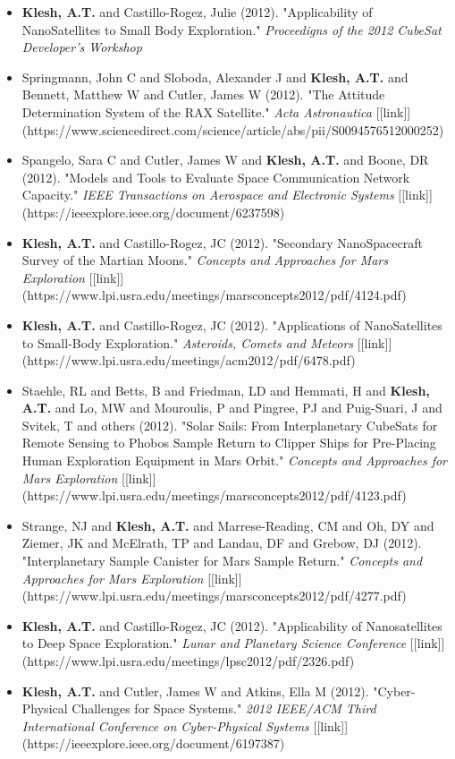 \documentclass[11pt,letterpaper]{article}
\begin{document}
\begin{itemize}
\item \textbf{Klesh, A.T.} and Castillo-Rogez, Julie (2012). "Applicability of NanoSatellites to Small Body Exploration." \textit{Proceedigns of the 2012 CubeSat Developer's Workshop}
\item Springmann, John C and Sloboda, Alexander J and \textbf{Klesh, A.T.} and Bennett, Matthew W and Cutler, James W (2012). "The Attitude Determination System of the RAX Satellite." \textit{Acta Astronautica} [[link]](https://www.sciencedirect.com/science/article/abs/pii/S0094576512000252)
\item Spangelo, Sara C and Cutler, James W and \textbf{Klesh, A.T.} and Boone, DR (2012). "Models and Tools to Evaluate Space Communication Network Capacity." \textit{IEEE Transactions on Aerospace and Electronic Systems} [[link]](https://ieeexplore.ieee.org/document/6237598)
\item \textbf{Klesh, A.T.} and Castillo-Rogez, JC (2012). "Secondary NanoSpacecraft Survey of the Martian Moons." \textit{Concepts and Approaches for Mars Exploration} [[link]](https://www.lpi.usra.edu/meetings/marsconcepts2012/pdf/4124.pdf)
\item \textbf{Klesh, A.T.} and Castillo-Rogez, JC (2012). "Applications of NanoSatellites to Small-Body Exploration." \textit{Asteroids, Comets and Meteors} [[link]](https://www.lpi.usra.edu/meetings/acm2012/pdf/6478.pdf)
\item Staehle, RL and Betts, B and Friedman, LD and Hemmati, H and \textbf{Klesh, A.T.} and Lo, MW and Mouroulis, P and Pingree, PJ and Puig-Suari, J and Svitek, T and others (2012). "Solar Sails: From Interplanetary CubeSats for Remote Sensing to Phobos Sample Return to Clipper Ships for Pre-Placing Human Exploration Equipment in Mars Orbit." \textit{Concepts and Approaches for Mars Exploration} [[link]](https://www.lpi.usra.edu/meetings/marsconcepts2012/pdf/4123.pdf)
\item Strange, NJ and \textbf{Klesh, A.T.} and Marrese-Reading, CM and Oh, DY and Ziemer, JK and McElrath, TP and Landau, DF and Grebow, DJ (2012). "Interplanetary Sample Canister for Mars Sample Return." \textit{Concepts and Approaches for Mars Exploration} [[link]](https://www.lpi.usra.edu/meetings/marsconcepts2012/pdf/4277.pdf)
\item \textbf{Klesh, A.T.} and Castillo-Rogez, JC (2012). "Applicability of Nanosatellites to Deep Space Exploration." \textit{Lunar and Planetary Science Conference} [[link]](https://www.lpi.usra.edu/meetings/lpsc2012/pdf/2326.pdf)
\item \textbf{Klesh, A.T.} and Cutler, James W and Atkins, Ella M (2012). "Cyber-Physical Challenges for Space Systems." \textit{2012 IEEE/ACM Third International Conference on Cyber-Physical Systems} [[link]](https://ieeexplore.ieee.org/document/6197387)

\end{itemize}
\end{document}
